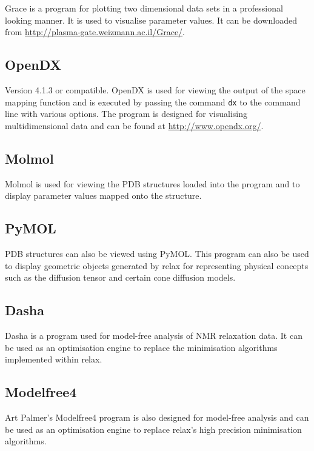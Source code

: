 Grace is a program for plotting two dimensional data sets in a professional looking manner.  It is used to visualise parameter values.  It can be downloaded from \href{http://plasma-gate.weizmann.ac.il/Grace/}{http://plasma-gate.weizmann.ac.il/Grace/}.


\subsection{OpenDX}

Version 4.1.3 or compatible.  OpenDX is used for viewing the output of the space mapping function and is executed by passing the command \texttt{dx} to the command line with various options.  The program is designed for visualising multidimensional data and can be found at \href{http://www.opendx.org/}{http://www.opendx.org/}.


\subsection{Molmol}

Molmol is used for viewing the PDB structures loaded into the program and to display parameter values mapped onto the structure.


\subsection{PyMOL}

PDB structures can also be viewed using PyMOL.  This program can also be used to display geometric objects generated by relax for representing physical concepts such as the diffusion tensor and certain cone diffusion models.


\subsection{Dasha}

Dasha is a program used for model-free analysis of NMR relaxation data.  It can be used as an optimisation engine to replace the minimisation algorithms implemented within relax.


\subsection{Modelfree4}

Art Palmer's Modelfree4 program is also designed for model-free analysis and can be used as an optimisation engine to replace relax's high precision minimisation algorithms.
